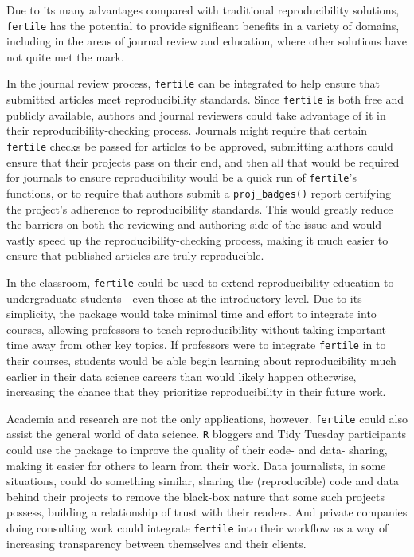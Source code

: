 \documentclass[12pt,twoside]{reedthesis}
\begin{document}
Due to its many advantages compared with traditional reproducibility solutions, \texttt{fertile} has the potential to provide significant benefits in a variety of domains, including in the areas of journal review and education, where other solutions have not quite met the mark.

In the journal review process, \texttt{fertile} can be integrated to help ensure that submitted articles meet reproducibility standards. Since \texttt{fertile} is both free and publicly available, authors and journal reviewers could take advantage of it in their reproducibility-checking process. Journals might require that certain \texttt{fertile} checks be passed for articles to be approved, submitting authors could ensure that their projects pass on their end, and then all that would be required for journals to ensure reproducibility would be a quick run of \texttt{fertile}'s functions, or to require that authors submit a \texttt{proj\_badges()} report certifying the project's adherence to reproducibility standards. This would greatly reduce the barriers on both the reviewing and authoring side of the issue and would vastly speed up the reproducibility-checking process, making it much easier to ensure that published articles are truly reproducible.

In the classroom, \texttt{fertile} could be used to extend reproducibility education to undergraduate students---even those at the introductory level. Due to its simplicity, the package would take minimal time and effort to integrate into courses, allowing professors to teach reproducibility without taking important time away from other key topics. If professors were to integrate \texttt{fertile} in to their courses, students would be able begin learning about reproducibility much earlier in their data science careers than would likely happen otherwise, increasing the chance that they prioritize reproducibility in their future work.

Academia and research are not the only applications, however. \texttt{fertile} could also assist the general world of data science. \texttt{R} bloggers and Tidy Tuesday participants could use the package to improve the quality of their code- and data- sharing, making it easier for others to learn from their work. Data journalists, in some situations, could do something similar, sharing the (reproducible) code and data behind their projects to remove the black-box nature that some such projects possess, building a relationship of trust with their readers. And private companies doing consulting work could integrate \texttt{fertile} into their workflow as a way of increasing transparency between themselves and their clients.
\end{document}
